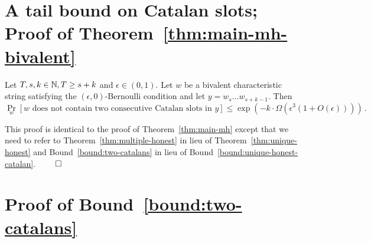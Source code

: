 \section{A tail bound on Catalan slots; Proof of Theorem~\ref{thm:main-mh-bivalent}}\label{sec:lcr-tie-bound-main-thm-proof}

  \begin{bound}\label{bound:two-catalans}
    Let $T, s, k \in \mathbb{N}, T \geq s + k$ and  $\epsilon \in (0, 1)$. 
    Let $w$ be a bivalent characteristic string satisfying 
    the $(\epsilon, 0)$-Bernoulli condition 
    and let $y = w_s \ldots w_{s+k-1}$.
    Then 
    \[
      \Pr_w[\text{$w$ does not contain two consecutive Catalan slots in $y$}]  
        \leq 
        \exp\left(
          - k\cdot \Omega(\epsilon^3(1 + O(\epsilon))) 
        \right)
        \,.
    \]
  \end{bound}

  This proof is identical to the proof of Theorem~\ref{thm:main-mh} 
  except that 
  we need to refer to Theorem~\ref{thm:multiple-honest} in lieu of Theorem~\ref{thm:unique-honest}
  and Bound~\ref{bound:two-catalans} in lieu of Bound~\ref{bound:unique-honest-catalan}.
  \hfill $\qed$  


\section{Proof of \texorpdfstring{Bound~\ref{bound:two-catalans}}{the Tail Bound} }\label{sec:lcr-tie-estimates}



